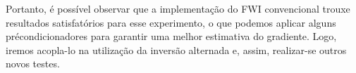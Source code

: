 Portanto, é possível observar que a implementação do FWI convencional trouxe resultados satisfatórios para esse experimento, o que podemos aplicar alguns précondicionadores para garantir uma melhor estimativa do gradiente. Logo, iremos acopla-lo na utilização da inversão alternada e, assim, realizar-se outros novos testes.






